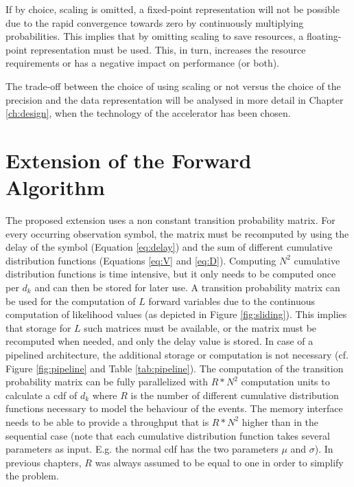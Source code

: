 \documentclass[mscthesis]{usiinfthesis}
\begin{document}
If by choice, scaling is omitted, a fixed-point representation will not be
possible due to the rapid convergence towards zero by continuously multiplying
probabilities. This implies that by omitting scaling to save resources,
a floating-point representation must be used. This, in turn, increases the
resource requirements or has a negative impact on performance (or both).

The trade-off between the choice of using scaling or not versus the choice of
the precision and the data representation will be analysed in more detail in
Chapter \ref{ch:design}, when the technology of the accelerator has been
chosen.

\section{Extension of the Forward Algorithm}
\label{ch:analysis_extension}

The proposed extension uses a non constant transition probability matrix. For
every occurring observation symbol, the matrix must be recomputed by using the
delay of the symbol (Equation \ref{eq:delay}) and the sum of different
cumulative distribution functions (Equations \ref{eq:V} and \ref{eq:D}).
Computing $N^2$ cumulative distribution functions is time intensive, but it only
needs to be computed once per $d_k$ and can then be stored for later use.
A transition probability matrix can be used for the computation of $L$ forward
variables due to the continuous computation of likelihood values (as depicted
in Figure \ref{fig:sliding}). This implies that storage for $L$ such matrices
must be available, or the matrix must be recomputed when needed, and only the
delay value is stored. In case of a pipelined architecture, the additional
storage or computation is not necessary (cf. Figure \ref{fig:pipeline} and
Table \ref{tab:pipeline}). The computation of the transition probability matrix
can be fully parallelized with $R*N^2$ computation units to calculate
a \gls{cdf} of $d_k$ where $R$ is the number of different cumulative
distribution functions necessary to model the behaviour of the events. The
memory interface needs to be able to provide a throughput that is $R*N^2$
higher than in the sequential case (note that each cumulative distribution
function takes several parameters as input. E.g. the normal \gls{cdf} has the
two parameters $\mu$ and $\sigma$). In previous chapters, $R$ was always
assumed to be equal to one in order to simplify the problem.
\end{document}
